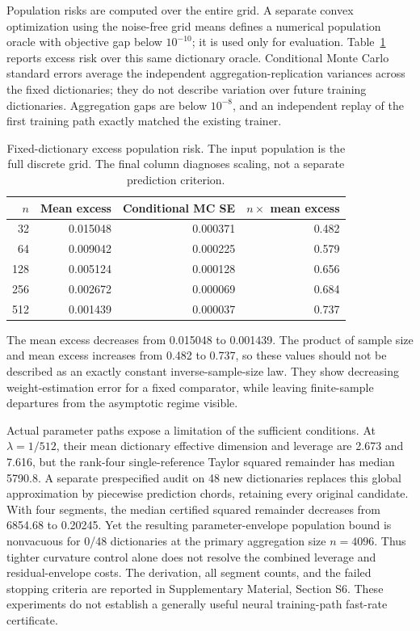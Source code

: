\documentclass[pdflatex,sn-mathphys-ay]{sn-jnl}
\theoremstyle{remark}\newtheorem{remark}[theorem]{Remark}
\begin{document}
Population risks are computed over the entire grid. A separate convex optimization using the noise-free grid means defines a numerical population oracle with objective gap below $10^{-10}$; it is used only for evaluation. Table~\ref{tab:fixedrate} reports excess risk over this same dictionary oracle. Conditional Monte Carlo standard errors average the independent aggregation-replication variances across the fixed dictionaries; they do not describe variation over future training dictionaries. Aggregation gaps are below $10^{-8}$, and an independent replay of the first training path exactly matched the existing trainer.

\begin{table}[htbp]\centering\small
\caption{Fixed-dictionary excess population risk. The input population is the full discrete grid. The final column diagnoses scaling, not a separate prediction criterion.}\label{tab:fixedrate}
\begin{tabular}{rrrr}\toprule
$n$ & Mean excess & Conditional MC SE & $n\times$ mean excess\\\midrule
32 & 0.015048 & 0.000371 & 0.482\\
64 & 0.009042 & 0.000225 & 0.579\\
128 & 0.005124 & 0.000128 & 0.656\\
256 & 0.002672 & 0.000069 & 0.684\\
512 & 0.001439 & 0.000037 & 0.737\\
\bottomrule\end{tabular}\end{table}

The mean excess decreases from 0.015048 to 0.001439. The product of sample size and mean excess increases from 0.482 to 0.737, so these values should not be described as an exactly constant inverse-sample-size law. They show decreasing weight-estimation error for a fixed comparator, while leaving finite-sample departures from the asymptotic regime visible.

Actual parameter paths expose a limitation of the sufficient conditions. At $\lambda=1/512$, their mean dictionary effective dimension and leverage are 2.673 and 7.616, but the rank-four single-reference Taylor squared remainder has median 5790.8. A separate prespecified audit on 48 new dictionaries replaces this global approximation by piecewise prediction chords, retaining every original candidate. With four segments, the median certified squared remainder decreases from 6854.68 to 0.20245. Yet the resulting parameter-envelope population bound is nonvacuous for 0/48 dictionaries at the primary aggregation size $n=4096$. Thus tighter curvature control alone does not resolve the combined leverage and residual-envelope costs. The derivation, all segment counts, and the failed stopping criteria are reported in Supplementary Material, Section S6. These experiments do not establish a generally useful neural training-path fast-rate certificate.
\end{document}
